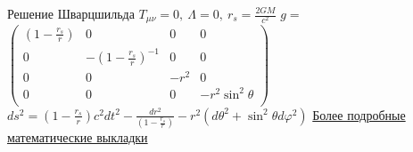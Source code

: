 \documentclass[
]{beamer}
\begin{document}
\begin{frame}{Решение Шварцшильда}
$T_{\mu\nu}=0,~\Lambda=0,~r_s=\displaystyle\frac{2GM}{c^2}$
\newline
\newline
\newline
$g=$
$\begin{pmatrix}
(1-\frac{r_s}{r}) & 0 & 0 & 0\\
0 & -(1-\frac{r_s}{r})^{-1} & 0 & 0\\
0 & 0 & -r^2 & 0\\
0 & 0 & 0 & -r^2\sin^2\theta\\
\end{pmatrix}$
\newline
\newline
\newline
$ds^2=(1-\frac{r_s}{r})c^2dt^2-\displaystyle\frac{dr^2}{(1-\frac{r_s}{r})}
-r^2(d\theta^2+\sin^2\theta d\varphi^2)$
\newline
\newline
\newline
\href{https://www.youtube.com/watch?v=3NFqXgH-4tg}{Более подробные математические выкладки}
\end{frame}
\end{document}
